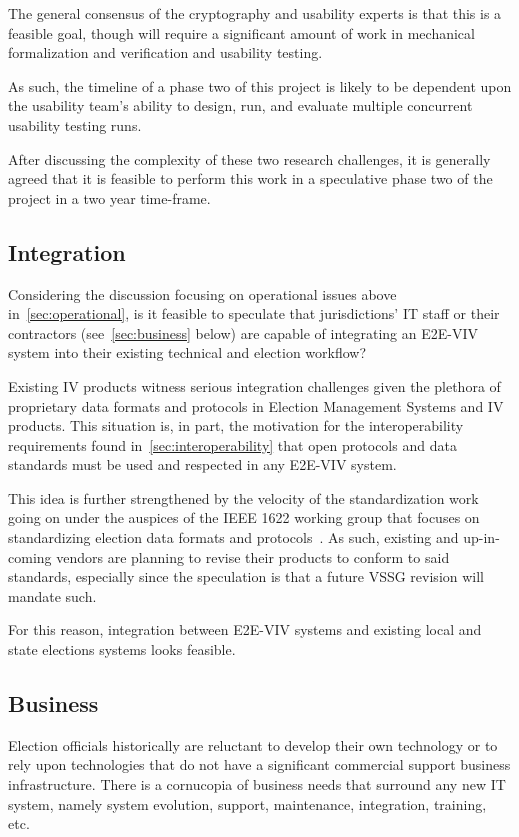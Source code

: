 The general consensus of the cryptography and usability experts is
that this is a feasible goal, though will require a significant amount
of work in mechanical formalization and verification and usability
testing.

As such, the timeline of a phase two of this project is likely to be
dependent upon the usability team's ability to design, run, and
evaluate multiple concurrent usability testing runs.  

After discussing the complexity of these two research challenges, it
is generally agreed that it is feasible to perform this work in a
speculative phase two of the project in a two year time-frame.

\subsection{Integration}

Considering the discussion focusing on operational issues above
in~\autoref{sec:operational}, is it feasible to speculate that
jurisdictions' IT staff or their contractors
(see~\autoref{sec:business} below) are capable of integrating an
E2E-VIV system into their existing technical and election workflow?

Existing IV products witness serious integration challenges given the
plethora of proprietary data formats and protocols in Election
Management Systems and IV products.  This situation is, in part, the
motivation for the interoperability requirements found
in~\autoref{sec:interoperability} that open protocols and data
standards must be used and respected in any E2E-VIV system.

This idea is further strengthened by the velocity of the
standardization work going on under the auspices of the IEEE 1622
working group that focuses on standardizing election data formats and
protocols~\cite{IEEE1622}. As such, existing and up-in-coming vendors
are planning to revise their products to conform to said standards,
especially since the speculation is that a future VSSG revision will
mandate such.

For this reason, integration between E2E-VIV systems and existing
local and state elections systems looks feasible.

\subsection{Business}
\label{sec:business}

Election officials historically are reluctant to develop their own
technology or to rely upon technologies that do not have a significant
commercial support business infrastructure. There is a cornucopia of
business needs that surround any new IT system, namely system
evolution, support, maintenance, integration, training,
etc. 

